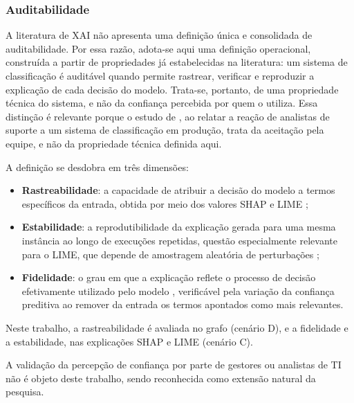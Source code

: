 \documentclass[
    12pt,                %
    openright,           %
    oneside,             %
    a4paper,             %
    english,             %
    brazil               %
]{abntex2}
\begin{document}
\subsubsection{Auditabilidade}
\label{subsec:auditabilidade}

A literatura de XAI não apresenta uma definição única e consolidada de
auditabilidade. Por essa razão, adota-se aqui uma definição operacional,
construída a partir de propriedades já estabelecidas na literatura: um
sistema de classificação é auditável quando permite rastrear, verificar
e reproduzir a explicação de cada decisão do modelo. Trata-se, portanto,
de uma propriedade técnica do sistema, e não da confiança percebida por
quem o utiliza. Essa distinção é relevante porque o estudo de , 
ao relatar a reação de analistas de suporte a um sistema de classificação 
em produção, trata da aceitação pela equipe, e não da propriedade técnica definida aqui.

A definição se desdobra em três dimensões:

\begin{itemize}
    \item \textbf{Rastreabilidade}: a capacidade de atribuir a decisão
    do modelo a termos específicos da entrada, obtida por meio dos
    valores SHAP \cite{lundberg2017} e LIME \cite{ribeiro2016};

    \item \textbf{Estabilidade}: a reprodutibilidade da explicação
    gerada para uma mesma instância ao longo de execuções repetidas,
    questão especialmente relevante para o LIME, que depende de
    amostragem aleatória de perturbações \cite{ribeiro2016};

    \item \textbf{Fidelidade}: o grau em que a explicação reflete o
    processo de decisão efetivamente utilizado pelo modelo
    \cite{jacovi2020}, verificável pela variação da confiança preditiva
    ao remover da entrada os termos apontados como mais relevantes.
\end{itemize}

Neste trabalho, a rastreabilidade é avaliada no grafo (cenário D), e a fidelidade e a estabilidade, nas explicações SHAP e LIME (cenário C).

A validação da percepção de confiança por parte de gestores ou analistas
de TI não é objeto deste trabalho, sendo reconhecida como extensão
natural da pesquisa.

\end{document}
